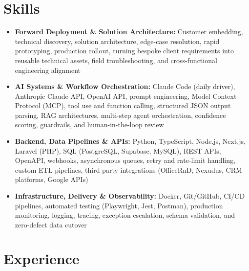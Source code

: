 \documentclass[a4paper,10pt]{article}
\begin{document}
\section{Skills}
\begin{itemize}
  \item \textbf{Forward Deployment \& Solution Architecture:} Customer embedding, technical discovery, solution architecture, edge-case resolution, rapid prototyping, production rollout, turning bespoke client requirements into reusable technical assets, field troubleshooting, and cross-functional engineering alignment
  \item \textbf{AI Systems \& Workflow Orchestration:} Claude Code (daily driver), Anthropic Claude API, OpenAI API, prompt engineering, Model Context Protocol (MCP), tool use and function calling, structured JSON output parsing, RAG architectures, multi-step agent orchestration, confidence scoring, guardrails, and human-in-the-loop review
  \item \textbf{Backend, Data Pipelines \& APIs:} Python, TypeScript, Node.js, Next.js, Laravel (PHP), SQL (PostgreSQL, Supabase, MySQL), REST APIs, OpenAPI, webhooks, asynchronous queues, retry and rate-limit handling, custom ETL pipelines, third-party integrations (OfficeRnD, Nexudus, CRM platforms, Google APIs)
  \item \textbf{Infrastructure, Delivery \& Observability:} Docker, Git/GitHub, CI/CD pipelines, automated testing (Playwright, Jest, Postman), production monitoring, logging, tracing, exception escalation, schema validation, and zero-defect data cutover
\end{itemize}

\section{Experience}
\end{document}

